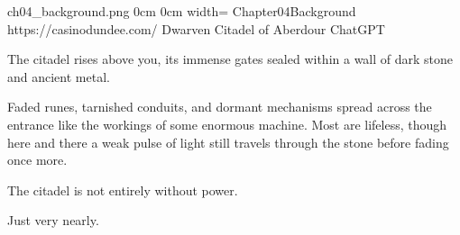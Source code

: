	{ch04_background.png}			%
	{0cm}							%
	{0cm}							%
	{width=\paperwidth}				%
	{Chapter04Background}			%
	{https://casinodundee.com/}		%
	{Dwarven Citadel of Aberdour}	%
	{ChatGPT}						%
	

\begin{DndReadAloud}
	The citadel rises above you, its immense gates sealed within a wall of dark stone and ancient metal.

	Faded runes, tarnished conduits, and dormant mechanisms spread across the entrance like the workings of some enormous machine. Most are lifeless, though here and there a weak pulse of light still travels through the stone before fading once more.

	The citadel is not entirely without power.

	Just very nearly.
\end{DndReadAloud}



